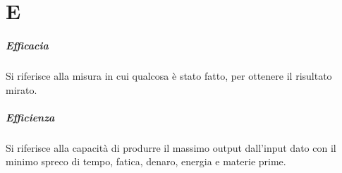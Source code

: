 \chapter{E}

\paragraph*{Efficacia}
Si riferisce alla misura in cui qualcosa è stato fatto, per ottenere il risultato mirato.

\paragraph*{Efficienza}
Si riferisce alla capacità di produrre il massimo output dall'input dato con il minimo spreco di tempo, fatica, denaro, energia e materie prime.
